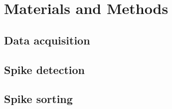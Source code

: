 \chapter{Materials and Methods}
\section{Data acquisition}
\section{Spike detection}
\section{Spike sorting}